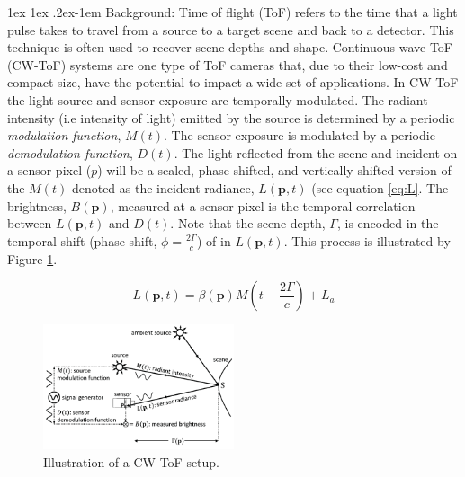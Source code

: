 \documentclass[12pt]{article}
\makeatletter
\def \p {\mathbf{p}}
\renewcommand{\paragraph}{%
  \@startsection{paragraph}{4}%
  {\z@}{1ex \@plus 1ex \@minus .2ex}{-1em}%
  {\normalfont\normalsize\bfseries}%
}
\makeatother
\begin{document}
\maketitle

\paragraph{Background:} Time of flight (ToF) refers to the time that a light pulse takes to travel from a source to a target scene and back to a detector. This technique is often used to recover scene depths and shape. Continuous-wave ToF (CW-ToF) systems are one type of ToF cameras that, due to their low-cost and compact size, have the potential to impact a wide set of applications. In CW-ToF the light source and sensor exposure are temporally modulated. The radiant intensity (i.e intensity of light) emitted by the source is determined by a periodic \textit{modulation function}, $M(t)$. The sensor exposure is modulated by a periodic \textit{demodulation function}, $D(t)$. The light reflected from the scene and incident on a sensor pixel ($p$) will be a scaled, phase shifted, and vertically shifted version of the $M(t)$ denoted as the incident radiance, $L(\p,t)$ (see equation \ref{eq:L}. The brightness, $B(\p)$, measured at a sensor pixel is the temporal correlation between $L(\p,t)$ and $D(t)$. Note that the scene depth, $\Gamma$, is encoded in the temporal shift (phase shift, $\phi = \frac{2\Gamma}{c}$) of in $L(\p,t)$. This process is illustrated by Figure \ref{fig:tofIllustration}.

\begin{equation} \label{eq:L}
    L(\p,t) = \beta(\p) M(t - \frac{2\Gamma}{c}) + L_a
\end{equation}

\begin{figure}[h]
\centerline{%
\includegraphics[width=0.5\textwidth]{"../Figures/tofIllustration"}%
}
\caption{Illustration of a CW-ToF setup.}
\label{fig:tofIllustration}
\end{figure}
\end{document}
